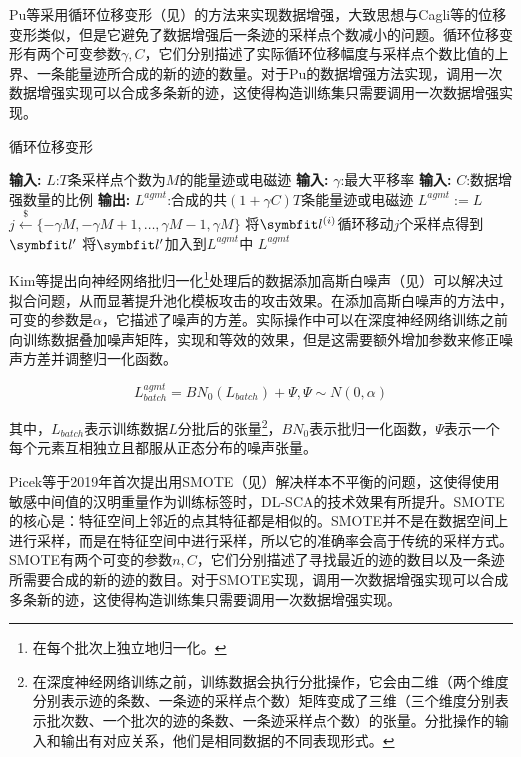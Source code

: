 {	Pu等\citep{Pu17}采用循环位移变形（见）的方法来实现数据增强，大致思想与Cagli等\citep{Cagli17}的位移变形类似，但是它避免了数据增强后一条迹的采样点个数减小的问题。循环位移变形有两个可变参数$\gamma,C$，它们分别描述了实际循环位移幅度与采样点个数比值的上界、一条能量迹所合成的新的迹的数量。对于Pu的数据增强方法实现，调用一次数据增强实现可以合成多条新的迹，这使得构造训练集只需要调用一次数据增强实现。
	
	\begin{breakablealgorithm}
		\caption{循环位移变形}\label{alg:RO}
		\begin{algorithmic}[1]
			\Statex \textbf{输入:} $L$:$T$条采样点个数为$M$的能量迹或电磁迹
			\Statex \textbf{输入:} $\gamma$:最大平移率
			\Statex \textbf{输入:} $C$:数据增强数量的比例
			\Statex \textbf{输出:} $L^{agmt}$:合成的共$(1+\gamma C)T$条能量迹或电磁迹
			\State $L^{agmt}:=L$
			\State $j\stackrel{\$}\gets \{-\gamma M,-\gamma M+1,\dots,\gamma M-1,\gamma M\}$
			\State 将$\Vector l^{(i)}$循环移动$j$个采样点得到$\Vector l^\prime$
			\State 将$\Vector l^\prime$加入到$L^{agmt}$中
			\EndFor
			\EndFor
			\State \Return $L^{agmt}$
		\end{algorithmic}
	\end{breakablealgorithm}
	
	Kim等\citep{Kim19}提出向神经网络批归一化\footnote{在每个批次上独立地归一化。}处理后的数据添加高斯白噪声（见）可以解决过拟合问题，从而显著提升池化模板攻击的攻击效果。在添加高斯白噪声的方法中，可变的参数是$\alpha$，它描述了噪声的方差。实际操作中可以在深度神经网络训练之前向训练数据叠加噪声矩阵，实现和等效的效果，但是这需要额外增加参数来修正噪声方差并调整归一化函数。
	
	\begin{equation}\label{eq:addnoise}
		 {L_{batch}^{agmt}}=BN_0(L_{batch})+\Psi,\Psi\sim N(0,\alpha)
	\end{equation}
	
	\noindent 其中，$L_{batch}$表示训练数据$L$分批后的张量\footnote{在深度神经网络训练之前，训练数据会执行分批操作，它会由二维（两个维度分别表示迹的条数、一条迹的采样点个数）矩阵变成了三维（三个维度分别表示批次数、一个批次的迹的条数、一条迹采样点个数）的张量。分批操作的输入和输出有对应关系，他们是相同数据的不同表现形式。}，$BN_0$表示批归一化函数，$\Psi$表示一个每个元素互相独立且都服从正态分布的噪声张量。
	
	Picek等\citep{Picek19}于2019年首次提出用SMOTE（见）解决样本不平衡的问题，这使得使用敏感中间值的汉明重量作为训练标签时，DL-SCA的技术效果有所提升。SMOTE的核心是：特征空间上邻近的点其特征都是相似的。SMOTE并不是在数据空间上进行采样，而是在特征空间中进行采样，所以它的准确率会高于传统的采样方式。SMOTE有两个可变的参数$n,C$，它们分别描述了寻找最近的迹的数目以及一条迹所需要合成的新的迹的数目。对于SMOTE实现，调用一次数据增强实现可以合成多条新的迹，这使得构造训练集只需要调用一次数据增强实现。
	
}
